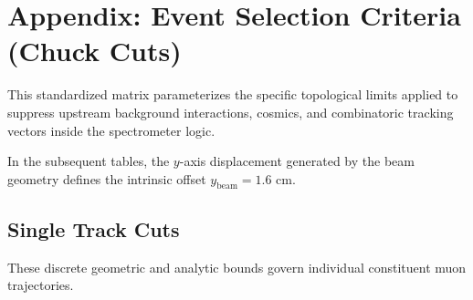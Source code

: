 \documentclass[11pt]{article}
\begin{document}
\section{Appendix: Event Selection Criteria (Chuck Cuts)}
\label{app:event_selection}

This standardized matrix parameterizes the specific topological limits applied to suppress upstream background interactions, cosmics, and combinatoric tracking vectors inside the spectrometer logic. 

In the subsequent tables, the $y$-axis displacement generated by the beam geometry defines the intrinsic offset $y_{\text{beam}} = 1.6$ cm.

\subsection{Single Track Cuts}
These discrete geometric and analytic bounds govern individual constituent muon trajectories.
\end{document}
